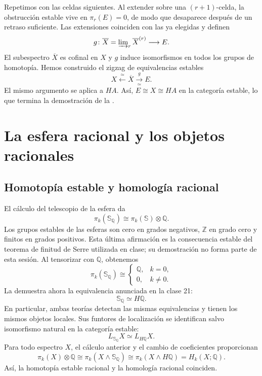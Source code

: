 Repetimos con las celdas siguientes. Al extender sobre una $(r+1)$-celda, la obstrucción estable vive en $\pi_r(E)=0$, de modo que desaparece después de un retraso suficiente. Las extensiones coinciden con las ya elegidas y definen
\[
g\colon\overline X=\varinjlim\nolimits_r\overline X^{(r)}
\longrightarrow E.
\]
El subespectro $\overline X$ es cofinal en $X$ y $g$ induce isomorfismos en todos los grupos de homotopía. Hemos construido el zigzag de equivalencias estables
\[
X\xleftarrow{\ \simeq\ }\overline X\xrightarrow[\simeq]{\ g\ }E.
\]
El mismo argumento se aplica a $HA$. Así, $E\cong X\cong HA$ en la categoría estable, lo que termina la demostración de la .

\section{La esfera racional y los objetos racionales}

\subsection{Homotopía estable y homología racional}
El cálculo del telescopio de la esfera da
\[
\pi_k(\mathbb S_{\mathbb Q})\cong\pi_k(\mathbb S)\otimes\mathbb Q.
\]
Los grupos estables de las esferas son cero en grados negativos, $\mathbb Z$ en grado cero y finitos en grados positivos. Esta última afirmación es la consecuencia estable del teorema de finitud de Serre utilizada en clase; su demostración no forma parte de esta sesión. Al tensorizar con $\mathbb Q$, obtenemos
\[
\pi_k(\mathbb S_{\mathbb Q})\cong
\begin{cases}
\mathbb Q,&k=0,\\
0,&k\ne0.
\end{cases}
\]
La  demuestra ahora la equivalencia anunciada en la clase 21:
\[
\mathbb S_{\mathbb Q}\simeq H\mathbb Q.
\]
En particular, ambas teorías detectan las mismas equivalencias y tienen los mismos objetos locales. Sus funtores de localización se identifican salvo isomorfismo natural en la categoría estable:
\[
L_{\mathbb S_{\mathbb Q}}X\simeq L_{H\mathbb Q}X.
\]
Para todo espectro $X$, el cálculo anterior y el cambio de coeficientes proporcionan
\[
\pi_k(X)\otimes\mathbb Q
\cong\pi_k(X\wedge\mathbb S_{\mathbb Q})
\cong\pi_k(X\wedge H\mathbb Q)
=H_k(X;\mathbb Q).
\]
Así, la homotopía estable racional y la homología racional coinciden.

